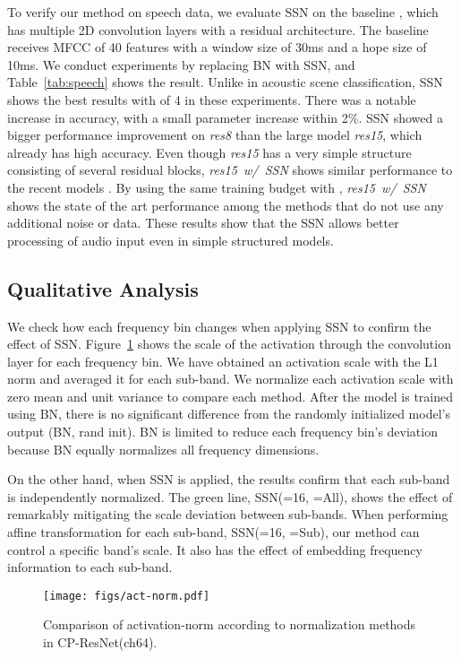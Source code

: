 \documentclass{article}
\begin{document}
To verify our method on speech data, we evaluate SSN on the baseline \cite{tang2018deep}, which has multiple 2D convolution layers with a residual architecture. The baseline receives MFCC of 40 features with a window size of 30ms and a hope size of 10ms.
We conduct experiments by replacing BN with SSN, and Table~\ref{tab:speech} shows the result. Unlike in acoustic scene classification, SSN shows the best results with  of 4 in these experiments. There was a notable increase in accuracy, with a small parameter increase within 2\%. SSN showed a bigger performance improvement on \textit{res8} than the large model \textit{res15}, which already has high accuracy. Even though \textit{res15} has a very simple structure consisting of several residual blocks, \textit{res15~w/~SSN} shows similar performance to the recent models \cite{choi2019temporal, lin2018edgespeechnets}. By using the same training budget with \cite{choi2019temporal}, \textit{res15~w/~SSN} shows the state of the art performance among the methods that do not use any additional noise or data. These results show that the SSN allows better processing of audio input even in simple structured models.

\subsection{Qualitative Analysis}
We check how each frequency bin changes when applying SSN to confirm the effect of SSN. Figure~\ref{fig:actnorm} shows the scale of the activation through the convolution layer for each frequency bin. We have obtained an activation scale with the L1 norm and averaged it for each sub-band. We normalize each activation scale with zero mean and unit variance to compare each method. After the model is trained using BN, there is no significant difference from the randomly initialized model's output (BN, rand init). BN is limited to reduce each frequency bin's deviation because BN equally normalizes all frequency dimensions.

On the other hand, when SSN is applied, the results confirm that each sub-band is independently normalized. The green line, SSN(=16, =All), shows the effect of remarkably mitigating the scale deviation between sub-bands. When performing affine transformation for each sub-band, SSN(=16, =Sub), our method can control a specific band's scale. It also has the effect of embedding frequency information to each sub-band.

\begin{figure}[t]
\centering
\texttt{[image: figs/act-norm.pdf]}
\vskip -0.2in
\caption{Comparison of activation-norm according to normalization methods in CP-ResNet(ch64). 
}
\label{fig:actnorm}
\end{figure}
\end{document}
